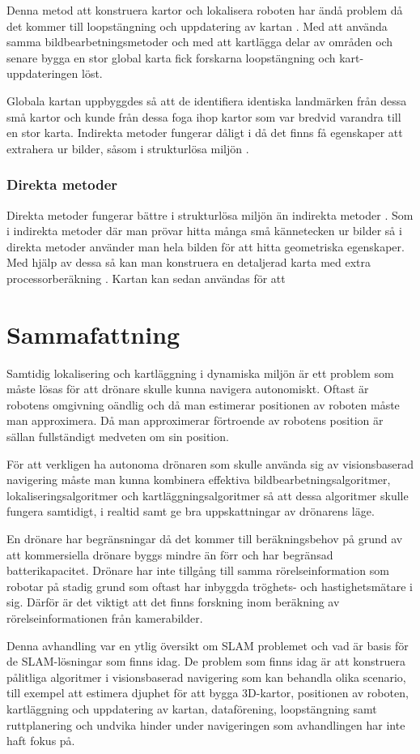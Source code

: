 Denna metod att konstruera kartor och lokalisera roboten har ändå problem då det kommer till loopstängning och uppdatering av kartan \citep{globalsubmaps}. Med att använda samma bildbearbetningsmetoder och med att kartlägga delar av områden och senare bygga en stor global karta fick forskarna loopstängning och kart-uppdateringen löst. 

Globala kartan uppbyggdes så att de identifiera identiska landmärken från dessa små kartor och kunde från dessa foga ihop kartor som var bredvid varandra till en stor karta. Indirekta metoder fungerar dåligt i då det finns få egenskaper att extrahera ur bilder, såsom i strukturlösa miljön \citep{geospatial}.

\subsection{Direkta metoder}

Direkta metoder fungerar bättre i strukturlösa miljön än indirekta metoder \citep{Engel2014LSDSLAMLD}. Som i indirekta metoder där man prövar hitta många små kännetecken ur bilder så i direkta metoder använder man hela bilden för att hitta geometriska egenskaper. Med hjälp av dessa så kan man konstruera en detaljerad karta med extra processorberäkning \citep{geospatial}. Kartan kan sedan användas för att 

\chapter{Sammafattning}

Samtidig lokalisering och kartläggning i dynamiska miljön är ett problem som måste lösas för att drönare skulle kunna navigera autonomiskt. Oftast är robotens omgivning oändlig och då man estimerar positionen av roboten måste man approximera. Då man approximerar förtroende av robotens position är sällan fullständigt medveten om sin position. 

För att verkligen ha autonoma drönaren som skulle använda sig av visionsbaserad navigering måste man kunna kombinera effektiva bildbearbetningsalgoritmer, lokaliseringsalgoritmer och kartläggningsalgoritmer så att dessa algoritmer skulle fungera samtidigt, i realtid samt ge bra uppskattningar av drönarens läge. 

En drönare har begränsningar då det kommer till beräkningsbehov på grund av att kommersiella drönare byggs mindre än förr och har begränsad batterikapacitet. Drönare har inte tillgång till samma rörelseinformation som robotar på stadig grund som oftast har inbyggda tröghets- och hastighetsmätare i sig. Därför är det viktigt att det finns forskning inom beräkning av rörelseinformationen från kamerabilder. 

Denna avhandling var en ytlig översikt om SLAM problemet och vad är basis för de SLAM-lösningar som finns idag. De problem som finns idag är att konstruera pålitliga algoritmer i visionsbaserad navigering som kan behandla olika scenario, till exempel att estimera djuphet för att bygga 3D-kartor, positionen av roboten, kartläggning och uppdatering av kartan, dataförening, loopstängning samt ruttplanering och undvika hinder under navigeringen som avhandlingen har inte haft fokus på.

